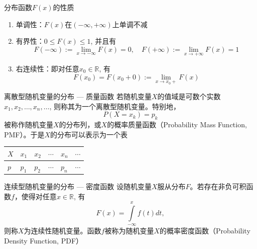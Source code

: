 
\begin{frame}

\begin{block}{分布函数$F(x)$的性质}
\begin{enumerate}
\item 单调性：$F(x)$在$(-\infty, +\infty)$上单调不减
\item 有界性：$0 \le F(x) \le 1$, 并且有
\[F(-\infty) := \lim\limits_{x\to-\infty} F(x) = 0, \quad F(+\infty) := \lim\limits_{x\to+\infty} F(x) = 1\]
\item 右连续性：即对任意$x_0\in\mathbb{R}$, 有
\[F(x_0) = F(x_0+0) := \lim\limits_{x\to x_0+} F(x)\]
\end{enumerate}
\end{block}

\end{frame}


\begin{frame}

\begin{block}{离散型随机变量的分布 --- 质量函数}
若随机变量$X$的值域是可数个实数$x_1,x_2, \ldots, x_n, \ldots$, 则称其为一个离散型随机变量。特别地，
\[P(X = x_k) = p_k\]
被称作随机变量$X$的分布列，或$X$的概率质量函数（Probability Mass Function, PMF）。于是$X$的分布可以表示为一个表
\begin{center}
\renewcommand{\arraystretch}{1.5}
\begin{tabu} to 0.8\textwidth { X[c] | X[c] | X[c] | X[c] | X[c] | X[c] }
\hline
$X$ & $x_1$ & $x_2$ & $\cdots$ & $x_n$ & $\cdots$ \\
\hline
$p$ & $p_1$ & $p_2$ & $\cdots$ & $p_n$ & $\cdots$ \\
\hline
\end{tabu}
\renewcommand{\arraystretch}{1}
\end{center}
\end{block}

\end{frame}


\begin{frame}

\begin{block}{连续型随机变量的分布 --- 密度函数}
设随机变量$X$服从分布$F$。若存在非负可积函数$f$，使得对任意$x\in\mathbb{R}$, 有
\[F(x) = \int\limits_{-\infty}^x f(t)dt,\]
则称$X$为连续性随机变量。函数$f$被称为随机变量$X$的概率密度函数（Probability Density Function, PDF）
\end{block}

\end{frame}

